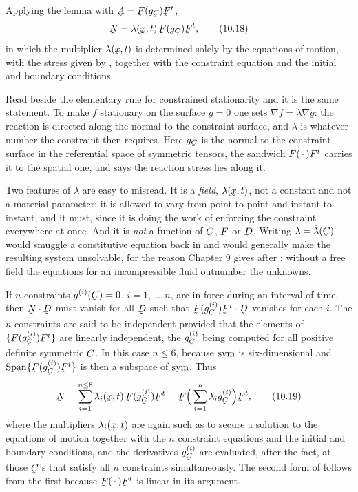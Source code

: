 Applying the lemma with $\bA=\bF(g_{\bC})\bF^{t}$,
\begin{equation}
   \bN=\lambda(\bx,t)\,\bF(g_{\bC})\bF^{t},
   \tag{10.18}\label{eq:10.18}
\end{equation}
in which the multiplier $\lambda(\bx,t)$ is determined solely by the
equations of motion, with the stress given by , together with
the constraint equation and the initial and boundary conditions.

\begin{remark}\label{rem:ch10lagrange}
Read  beside the elementary rule for constrained
stationarity and it is the same statement. To make $f$ stationary on the
surface $g=0$ one sets $\nabla f=\lambda\nabla g$: the reaction is
directed along the normal to the constraint surface, and $\lambda$ is
whatever number the constraint then requires. Here $g_{\bC}$ is the
normal to the constraint surface in the referential space of symmetric
tensors, the sandwich $\bF(\,\cdot\,)\bF^{t}$ carries it to the spatial
one, and  says the reaction stress lies along it.

Two features of $\lambda$ are easy to misread. It is a \emph{field},
$\lambda(\bx,t)$, not a constant and not a material parameter: it is
allowed to vary from point to point and instant to instant, and it must,
since it is doing the work of enforcing the constraint everywhere at
once. And it is \emph{not} a function of $\bC$, $\bF$ or $\bD$. Writing
$\lambda=\hat\lambda(\bC)$ would smuggle a constitutive equation back in
and would generally make the resulting system unsolvable, for the reason
Chapter 9 gives after : without a free field the equations for
an incompressible fluid outnumber the unknowns.
\end{remark}

If $n$ constraints $g^{(i)}(\bC)=0$, $i=1,\dots,n$, are in force during
an interval of time, then $\bN\cdot\bD$ must vanish for all $\bD$ such
that $\bF(g^{(i)}_{\bC})\bF^{t}\cdot\bD$ vanishes for each $i$. The $n$
constraints are said to be independent provided that the elements of
$\{\bF(g^{(i)}_{\bC})\bF^{t}\}$ are linearly independent, the
$g^{(i)}_{\bC}$ being computed for all positive definite symmetric $\bC$.
In this case $n\leq6$, because $\operatorname{sym}$ is six-dimensional and
$\mathrm{Span}\{\bF(g^{(i)}_{\bC})\bF^{t}\}$ is then a subspace of
$\operatorname{sym}$. Thus
\begin{equation}
   \bN=\sum_{i=1}^{n\leq6}\lambda_{i}(\bx,t)\,\bF(g^{(i)}_{\bC})\bF^{t}
   =\bF\Big(\sum_{i=1}^{n}\lambda_{i}g^{(i)}_{\bC}\Big)\bF^{t},
   \tag{10.19}\label{eq:10.19}
\end{equation}
where the multipliers $\lambda_{i}(\bx,t)$ are again such as to secure a
solution to the equations of motion together with the $n$ constraint
equations and the initial and boundary conditions, and the derivatives
$g^{(i)}_{\bC}$ are evaluated, after the fact, at those $\bC$'s that
satisfy all $n$ constraints simultaneously. The second form of
 follows from the first because $\bF(\,\cdot\,)\bF^{t}$ is
linear in its argument.

